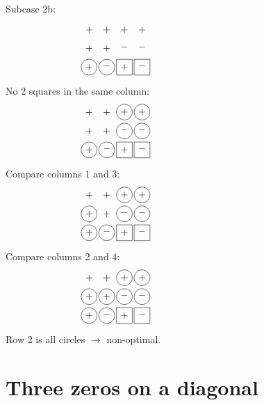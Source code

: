 Subcase 2b:
\begin{equation*}
\myarrset
\begin{array}{cccc}
\ndcp & \ndcp & \ndcp & \ndcp \\
\ndcp & \ndcp & \ndcm & \ndcm \\
\dcp  & \dcm  & \dsp  & \dsm
\end{array}
~~~~~~~~~~~~~~~~~~~~~~~~~~~~~~~~~~~~~~~~
\end{equation*}
No 2 squares in the same column:
\begin{equation*}
\myarrset
\begin{array}{cccc}
\ndcp & \ndcp & \dcp  & \dcp  \\
\ndcp & \ndcp & \dcm  & \dcm  \\
\dcp  & \dcm  & \dsp  & \dsm
\end{array}
~~~~~~~~~~~~~~~~~~~~~~~~~~~~~~~~~~~~~~~~
\end{equation*}
Compare columns 1 and 3:
\begin{equation*}
\myarrset
\begin{array}{cccc}
\ndcp & \ndcp  & \dcp  & \dcp  \\
\dcp  & \ndcp  & \dcm  & \dcm  \\
\dcp  & \dcm   & \dsp  & \dsm
\end{array}
~~~~~~~~~~~~~~~~~~~~~~~~~~~~~~~~~~~~~~~~
\end{equation*}
Compare columns 2 and 4:
\begin{equation*}
\myarrset
\begin{array}{cccc}
\ndcp & \ndcp  & \dcp  & \dcp  \\
\dcp  & \dcp   & \dcm  & \dcm  \\
\dcp  & \dcm   & \dsp  & \dsm
\end{array}
~~~~~~~~~~~~~~~~~~~~~~~~~~~~~~~~~~~~~~~~
\end{equation*}
Row 2 is all circles $\rightarrow$ non-optimal.

\section*{Three zeros on a diagonal}

